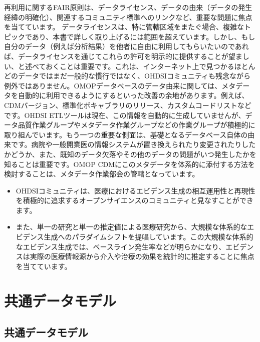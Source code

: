 \documentclass[
  11pt]{book}
\makeatletter
\newenvironment{kframe}{%
\medskip{}
\setlength{\fboxsep}{.8em}
 \def\at@end@of@kframe{}%
 \ifinner\ifhmode%
  \def\at@end@of@kframe{\end{minipage}}%
  \begin{minipage}{\columnwidth}%
 \fi\fi%
 \def\FrameCommand##1{\hskip\@totalleftmargin \hskip-\fboxsep
 \colorbox{myShadeColor}{##1}\hskip-\fboxsep
     \hskip-\linewidth \hskip-\@totalleftmargin \hskip\columnwidth}%
 \MakeFramed {\advance\hsize-\width
   \@totalleftmargin\z@ \linewidth\hsize
   \@setminipage}}%
 {\par\unskip\endMakeFramed%
 \at@end@of@kframe}
\newenvironment{rmdblock}[1]
  {
  \begin{itemize}
  \renewcommand{\labelitemi}{
    \raisebox{-.7\height}[0pt][0pt]{
      {\setkeys{Gin}{width=3em,keepaspectratio}\texttt{[image: images/\#1]}}
    }
  }
  \setlength{\fboxsep}{1em}
  \begin{kframe}
  \item
  }
  {
  \end{kframe}
  \end{itemize}
  }
\newenvironment{rmdsummary}
  {\begin{rmdblock}{summary}}
  {\end{rmdblock}}
\theoremstyle{definition}
\theoremstyle{definition}
\theoremstyle{definition}
\theoremstyle{definition}
\theoremstyle{remark}
\makeatother
\begin{document}
再利用に関するFAIR原則は、データライセンス、データの由来（データの発生経緯の明確化）、関連するコミュニティ標準へのリンクなど、重要な問題に焦点を当てています。 データライセンスは、特に管轄区域をまたぐ場合、複雑なトピックであり、本書で詳しく取り上げるには範囲を超えています。しかし、もし自分のデータ（例えば分析結果）を他者に自由に利用してもらいたいのであれば、データライセンスを通じてこれらの許可を明示的に提供することが望ましい、と述べておくことは重要です。これは、インターネット上で見つかるほとんどのデータではまだ一般的な慣行ではなく、OHDSIコミュニティも残念ながら例外ではありません。OMOPデータベースのデータ由来に関しては、メタデータを自動的に利用できるようにするといった改善の余地があります。例えば、CDMバージョン、標準化ボキャブラリのリリース、カスタムコードリストなどです。OHDSI ETLツールは現在、この情報を自動的に生成していませんが、データ品質作業グループやメタデータ作業グループなどの作業グループが積極的に取り組んでいます。もう一つの重要な側面は、基礎となるデータベース自体の由来です。病院や一般開業医の情報システムが置き換えられたり変更されたりしたかどうか、また、既知のデータ欠落やその他のデータの問題がいつ発生したかを知ることは重要です。OMOP CDMにこのメタデータを体系的に添付する方法を検討することは、メタデータ作業部会の管轄となっています。

\begin{rmdsummary}
\begin{itemize}
\item
  OHDSIコミュニティは、医療におけるエビデンス生成の相互運用性と再現性を積極的に追求するオープンサイエンスのコミュニティと見なすことができます。
\item
  また、単一の研究と単一の推定値による医療研究から、大規模な体系的なエビデンス生成へのパラダイムシフトを提唱しています。この大規模な体系的なエビデンス生成では、ベースライン発生率などが明らかになり、エビデンスは実際の医療情報源から介入や治療の効果を統計的に推定することに焦点を当てています。
\end{itemize}
\end{rmdsummary}

\part{共通データモデル}\label{part-ux5171ux901aux30c7ux30fcux30bfux30e2ux30c7ux30eb}

\chapter{共通データモデル}\label{CommonDataModel}
\end{document}

